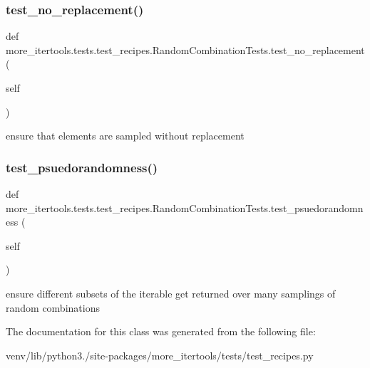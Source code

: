 \subsubsection{\texorpdfstring{test\+\_\+no\+\_\+replacement()}{test\_no\_replacement()}}
{\footnotesize\ttfamily def more\+\_\+itertools.\+tests.\+test\+\_\+recipes.\+Random\+Combination\+Tests.\+test\+\_\+no\+\_\+replacement (\begin{DoxyParamCaption}\item[{}]{self }\end{DoxyParamCaption})}

\begin{DoxyVerb}ensure that elements are sampled without replacement\end{DoxyVerb}
 \mbox{\label{classmore__itertools_1_1tests_1_1test__recipes_1_1_random_combination_tests_a461d9e78c1cc6f56fc21ae8e7223572d}} 
\subsubsection{\texorpdfstring{test\+\_\+psuedorandomness()}{test\_psuedorandomness()}}
{\footnotesize\ttfamily def more\+\_\+itertools.\+tests.\+test\+\_\+recipes.\+Random\+Combination\+Tests.\+test\+\_\+psuedorandomness (\begin{DoxyParamCaption}\item[{}]{self }\end{DoxyParamCaption})}

\begin{DoxyVerb}ensure different subsets of the iterable get returned over many
samplings of random combinations\end{DoxyVerb}
 

The documentation for this class was generated from the following file\+:\begin{DoxyCompactItemize}
\item 
venv/lib/python3./site-\/packages/more\+\_\+itertools/tests/test\+\_\+recipes.\+py\end{DoxyCompactItemize}
